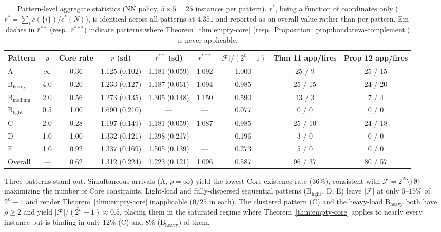 \documentclass[11pt]{article}
\theoremstyle{plain}
\theoremstyle{definition}
\theoremstyle{remark}
\newcommand{\F}{\mathcal{F}}
\newcommand{\cstar}{c^{\ast}}
\begin{document}
\begin{table}[t]
\centering
\caption{Pattern-level aggregate statistics (NN policy, $5\times 5=25$ instances per pattern). $\bar r^{\ast}$, being a function of coordinates only ($r^{\ast} = \sum_i c(\{i\})/\cstar(N)$), is identical across all patterns at $4.351$ and reported as an overall value rather than per-pattern. Em-dashes in $\bar r^{\ast\ast}$ (resp.\ $\bar r^{\ast\ast\ast}$) indicate patterns where Theorem~\ref{thm:empty-core} (resp.\ Proposition~\ref{prop:bondareva-complement}) is never applicable.}
\label{tab:pattern}
\small
\begin{tabular}{@{}lcccccccc@{}}
\toprule
Pattern & $\rho$ & Core rate & $\bar r$ (sd) & $\bar r^{\ast\ast}$ (sd) & $\bar r^{\ast\ast\ast}$ & $\overline{|\F|/(2^n-1)}$ & Thm 11 app/fires & Prop 12 app/fires \\
\midrule
A                           & $\infty$ & 0.36 & 1.125 (0.102) & 1.181 (0.059) & 1.092 & 1.000 & 25 / 9  & 25 / 15 \\
$\text{B}_{\text{heavy}}$   & 4.0      & 0.20 & 1.233 (0.127) & 1.187 (0.061) & 1.094 & 0.985 & 25 / 15 & 24 / 20 \\
$\text{B}_{\text{medium}}$  & 2.0      & 0.56 & 1.273 (0.135) & 1.305 (0.148) & 1.150 & 0.590 & 13 / 3  &  7 /  4 \\
$\text{B}_{\text{light}}$   & 0.5      & 1.00 & 1.690 (0.210) &      ---      &  ---  & 0.077 &  0 / 0  &  0 /  0 \\
C                           & 2.0      & 0.28 & 1.197 (0.149) & 1.181 (0.059) & 1.087 & 0.985 & 25 / 10 & 24 / 18 \\
D                           & 1.0      & 1.00 & 1.332 (0.121) & 1.398 (0.217) &  ---  & 0.196 &  3 / 0  &  0 /  0 \\
E                           & 1.0      & 0.92 & 1.337 (0.169) & 1.505 (0.139) &  ---  & 0.273 &  5 / 0  &  0 /  0 \\
\midrule
Overall                     & ---      & 0.62 & 1.312 (0.224) & 1.223 (0.121) & 1.096 & 0.587 & 96 / 37 & 80 / 57 \\
\bottomrule
\end{tabular}
\end{table}

Three patterns stand out. Simultaneous arrivals (A, $\rho=\infty$) yield the lowest Core-existence rate ($36\%$), consistent with $\F=2^N\setminus\{\emptyset\}$ maximizing the number of Core constraints. Light-load and fully-dispersed sequential patterns ($\text{B}_{\text{light}}$, D, E) leave $|\F|$ at only $6$--$15\%$ of $2^n-1$ and render Theorem~\ref{thm:empty-core} inapplicable ($0/25$ in each). The clustered pattern (C) and the heavy-load $\text{B}_{\text{heavy}}$ both have $\rho\ge 2$ and yield $\overline{|\F|/(2^n-1)}\approx 0.5$, placing them in the saturated regime where Theorem~\ref{thm:empty-core} applies to nearly every instance but is binding in only $12\%$ (C) and $8\%$ ($\text{B}_{\text{heavy}}$) of them.
\end{document}
